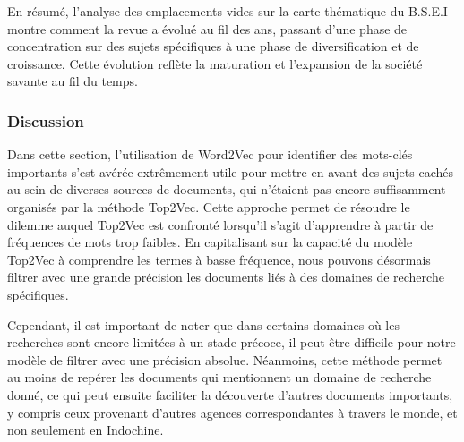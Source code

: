En résumé, l'analyse des emplacements vides sur la carte thématique du B.S.E.I montre comment la revue a évolué au fil des ans, passant d'une phase de concentration sur des sujets spécifiques à une phase de diversification et de croissance. Cette évolution reflète la maturation et l'expansion de la société savante au fil du temps.


\subsubsection{Discussion}
Dans cette section, l'utilisation de Word2Vec pour identifier des mots-clés importants s'est avérée extrêmement utile pour mettre en avant des sujets cachés au sein de diverses sources de documents, qui n'étaient pas encore suffisamment organisés par la méthode Top2Vec. Cette approche permet de résoudre le dilemme auquel Top2Vec est confronté lorsqu'il s'agit d'apprendre à partir de fréquences de mots trop faibles. En capitalisant sur la capacité du modèle Top2Vec à comprendre les termes à basse fréquence, nous pouvons désormais filtrer avec une grande précision les documents liés à des domaines de recherche spécifiques.

Cependant, il est important de noter que dans certains domaines où les recherches sont encore limitées à un stade précoce, il peut être difficile pour notre modèle de filtrer avec une précision absolue. Néanmoins, cette méthode permet au moins de repérer les documents qui mentionnent un domaine de recherche donné, ce qui peut ensuite faciliter la découverte d'autres documents importants, y compris ceux provenant d'autres agences correspondantes à travers le monde, et non seulement en Indochine.

